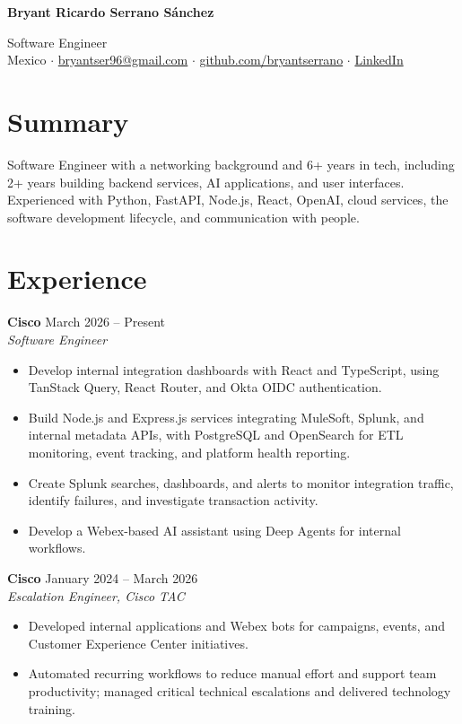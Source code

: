\documentclass[10pt,letterpaper]{article}
\newcommand{\role}[3]{\textbf{#1} \hfill #3\\\textit{#2}\par}
\begin{document}
\begin{center}
{\LARGE\bfseries Bryant Ricardo Serrano Sánchez}

{\large Software Engineer}\\[4pt]


Mexico $\cdot$ \href{mailto:bryantser96@gmail.com}{bryantser96@gmail.com} $\cdot$
\href{https://github.com/bryantserrano}{github.com/bryantserrano} $\cdot$
\href{https://www.linkedin.com/in/bryant-serrano-658166189}{LinkedIn} 

\end{center}
\vspace{-6pt}


\section*{Summary}
Software Engineer with a networking background and 6+ years in tech, including 2+ years building backend services, AI applications, and user interfaces. Experienced with Python, FastAPI, Node.js, React, OpenAI, cloud services, the software development lifecycle, and communication with people.

\section*{Experience}
\role{Cisco}{Software Engineer}{March 2026 -- Present}
\begin{itemize}
  \item Develop internal integration dashboards with React and TypeScript, using TanStack Query, React Router, and Okta OIDC authentication.
  \item Build Node.js and Express.js services integrating MuleSoft, Splunk, and internal metadata APIs, with PostgreSQL and OpenSearch for ETL monitoring, event tracking, and platform health reporting.
  \item Create Splunk searches, dashboards, and alerts to monitor integration traffic, identify failures, and investigate transaction activity.
  \item Develop a Webex-based AI assistant using Deep Agents for internal workflows.
\end{itemize}

\role{Cisco}{Escalation Engineer, Cisco TAC}{January 2024 -- March 2026}
\begin{itemize}
  \item Developed internal applications and Webex bots for campaigns, events, and Customer Experience Center initiatives.
  \item Automated recurring workflows to reduce manual effort and support team productivity; managed critical technical escalations and delivered technology training.
\end{itemize}
\end{document}
